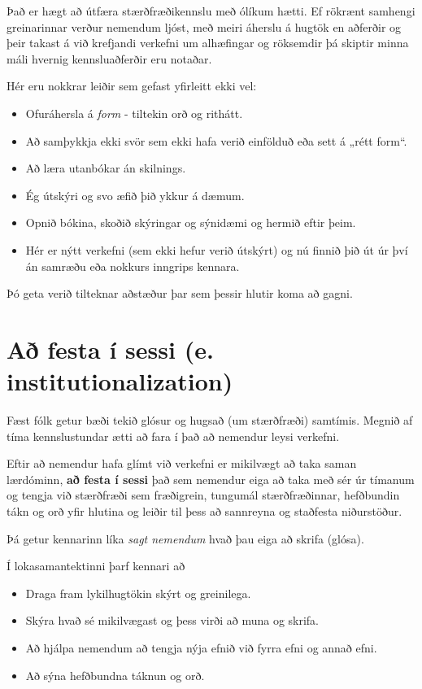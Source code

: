 \documentclass[
  icelandic,
]{book}
\providecommand{\tightlist}{%
  \setlength{\itemsep}{0pt}\setlength{\parskip}{0pt}}
\begin{document}
Það er hægt að útfæra stærðfræðikennslu með ólíkum hætti. Ef rökrænt samhengi greinarinnar verður nemendum ljóst, með meiri áherslu á hugtök en aðferðir og þeir takast á við krefjandi verkefni um alhæfingar og röksemdir þá skiptir minna máli hvernig kennsluaðferðir eru notaðar.

Hér eru nokkrar leiðir sem gefast yfirleitt ekki vel:

\begin{itemize}
\tightlist
\item
  Ofuráhersla á \emph{form} - tiltekin orð og rithátt.
\item
  Að samþykkja ekki svör sem ekki hafa verið einfölduð eða sett á „rétt form``.
\item
  Að læra utanbókar án skilnings.
\item
  Ég útskýri og svo æfið þið ykkur á dæmum.
\item
  Opnið bókina, skoðið skýringar og sýnidæmi og hermið eftir þeim.
\item
  Hér er nýtt verkefni (sem ekki hefur verið útskýrt) og nú finnið þið út úr því án samræðu eða nokkurs inngrips kennara.
\end{itemize}

Þó geta verið tilteknar aðstæður þar sem þessir hlutir koma að gagni.

\section{Að festa í sessi (e. institutionalization)}\label{auxf0-festa-uxed-sessi-e.-institutionalization}

Fæst fólk getur bæði tekið glósur og hugsað (um stærðfræði) samtímis. Megnið af tíma kennslustundar ætti að fara í það að nemendur leysi verkefni.

Eftir að nemendur hafa glímt við verkefni er mikilvægt að taka saman lærdóminn, \textbf{að festa í sessi} það sem nemendur eiga að taka með sér úr tímanum og tengja við stærðfræði sem fræðigrein, tungumál stærðfræðinnar, hefðbundin tákn og orð yfir hlutina og leiðir til þess að sannreyna og staðfesta niðurstöður.

Þá getur kennarinn líka \emph{sagt nemendum} hvað þau eiga að skrifa (glósa).

Í lokasamantektinni þarf kennari að

\begin{itemize}
\tightlist
\item
  Draga fram lykilhugtökin skýrt og greinilega.
\item
  Skýra hvað sé mikilvægast og þess virði að muna og skrifa.
\item
  Að hjálpa nemendum að tengja nýja efnið við fyrra efni og annað efni.
\item
  Að sýna hefðbundna táknun og orð.
\end{itemize}
\end{document}
